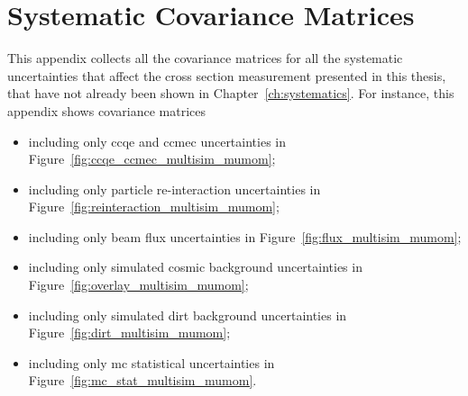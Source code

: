 \chapter{Systematic Covariance Matrices}
\label{ch:appendix_systematics}


This appendix collects all the covariance matrices for all the systematic uncertainties that affect the cross section measurement presented in this thesis, that have not already been shown in Chapter~\ref{ch:systematics}.
For instance, this appendix shows covariance matrices 
\begin{itemize}
\item including only \acrshort{cc}\acrshort{qe} and \acrshort{cc}\acrshort{mec} uncertainties in Figure~\ref{fig:ccqe_ccmec_multisim_mumom};
\item including only particle re-interaction uncertainties in Figure~\ref{fig:reinteraction_multisim_mumom};
\item including only beam flux uncertainties in Figure~\ref{fig:flux_multisim_mumom};
\item including only simulated cosmic background uncertainties in Figure~\ref{fig:overlay_multisim_mumom};
\item including only simulated dirt background uncertainties in Figure~\ref{fig:dirt_multisim_mumom};
\item including only \acrshort{mc} statistical uncertainties in Figure~\ref{fig:mc_stat_multisim_mumom}.
\end{itemize}



